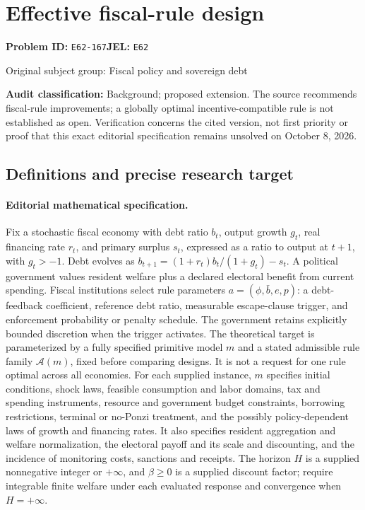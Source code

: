 \documentclass[11pt,a4paper]{article}
\begin{document}
\section*{Effective fiscal-rule design}
\textbf{Problem ID:} \texttt{E62-167}\quad \textbf{JEL:} \texttt{E62}\par
\label{problem:OP-0259}
{\sffamily\small\color{muted}Original subject group: Fiscal policy and sovereign debt\par}
\label{definitions:problem:30007540}
\textbf{Audit classification:} Background; proposed extension. The source recommends fiscal-rule improvements; a globally optimal incentive-compatible rule is not established as open. Verification concerns the cited version, not first priority or proof that this exact editorial specification remains unsolved on October 8, 2026.
\subsection*{Definitions and precise research target}
\paragraph{Editorial mathematical specification.} Fix a stochastic fiscal economy with debt ratio \(b_t\), output growth \(g_t\), real financing rate \(r_t\), and primary surplus \(s_t\), expressed as a ratio to output at \(t+1\), with \(g_t>-1\). Debt evolves as \(b_{t+1}=(1+r_t)b_t/(1+g_t)-s_t\). A political government values resident welfare plus a declared electoral benefit from current spending. Fiscal institutions select rule parameters \(a=(\phi,\bar b,e,p)\): a debt-feedback coefficient, reference debt ratio, measurable escape-clause trigger, and enforcement probability or penalty schedule. The government retains explicitly bounded discretion when the trigger activates.
The theoretical target is parameterized by a fully specified primitive model \(m\) and a stated admissible rule family \(\mathcal A(m)\), fixed before comparing designs. It is not a request for one rule optimal across all economies. For each supplied instance, \(m\) specifies initial conditions, shock laws, feasible consumption and labor domains, tax and spending instruments, resource and government budget constraints, borrowing restrictions, terminal or no-Ponzi treatment, and the possibly policy-dependent laws of growth and financing rates. It also specifies resident aggregation and welfare normalization, the electoral payoff and its scale and discounting, and the incidence of monitoring costs, sanctions and receipts. The horizon \(H\) is a supplied nonnegative integer or \(+\infty\), and \(\beta\geq0\) is a supplied discount factor; require integrable finite welfare under each evaluated response and convergence when \(H=+\infty\).
\end{document}
